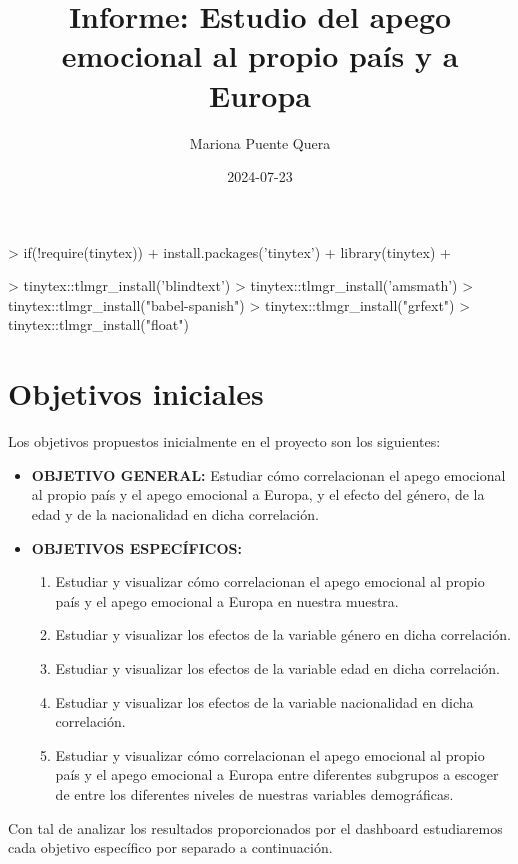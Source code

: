 \documentclass{article}
\title{Informe: Estudio del apego emocional al propio país y a Europa}
\author{Mariona Puente Quera}
\date{2024-07-23}
\begin{document}
\maketitle

\begin{Schunk}
\begin{Sinput}
> if(!require(tinytex)){
+   install.packages('tinytex')
+   library(tinytex)
+ }
\end{Sinput}
\end{Schunk}

\begin{Schunk}
\begin{Sinput}
> tinytex::tlmgr_install('blindtext')
> tinytex::tlmgr_install('amsmath')
> tinytex::tlmgr_install("babel-spanish")
> tinytex::tlmgr_install("grfext")
> tinytex::tlmgr_install("float")
\end{Sinput}
\end{Schunk}

\section*{Objetivos iniciales}
Los objetivos propuestos inicialmente en el proyecto son los siguientes:

\begin{itemize}
    \item \textbf{OBJETIVO GENERAL:} Estudiar cómo correlacionan el apego emocional al propio país y el apego emocional a Europa, y el efecto del género, de la edad y de la nacionalidad en dicha correlación.
    \item \textbf{OBJETIVOS ESPECÍFICOS:}
    \begin{enumerate}
        \item Estudiar y visualizar cómo correlacionan el apego emocional al propio país y el apego emocional a Europa en nuestra muestra.
        \item Estudiar y visualizar los efectos de la variable género en dicha correlación.
        \item Estudiar y visualizar los efectos de la variable edad en dicha correlación.
        \item Estudiar y visualizar los efectos de la variable nacionalidad en dicha correlación.
        \item Estudiar y visualizar cómo correlacionan el apego emocional al propio país y el apego emocional a Europa entre diferentes subgrupos a escoger de entre los diferentes niveles de nuestras variables demográficas.
    \end{enumerate}
\end{itemize}
Con tal de analizar los resultados proporcionados por el dashboard estudiaremos cada objetivo específico por separado a continuación.
\end{document}
